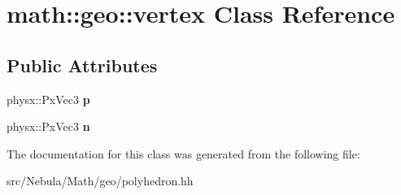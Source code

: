 \hypertarget{classmath_1_1geo_1_1vertex}{\section{math\-:\-:geo\-:\-:vertex \-Class \-Reference}
\label{classmath_1_1geo_1_1vertex}
}
\subsection*{\-Public \-Attributes}
\begin{DoxyCompactItemize}
\item 
\hypertarget{classmath_1_1geo_1_1vertex_ac68d02726094408a170228135a68a1ef}{physx\-::\-Px\-Vec3 {\bfseries p}}\label{classmath_1_1geo_1_1vertex_ac68d02726094408a170228135a68a1ef}

\item 
\hypertarget{classmath_1_1geo_1_1vertex_af0bd124b0e264a44aa5ee617e423c95d}{physx\-::\-Px\-Vec3 {\bfseries n}}\label{classmath_1_1geo_1_1vertex_af0bd124b0e264a44aa5ee617e423c95d}

\end{DoxyCompactItemize}


\-The documentation for this class was generated from the following file\-:\begin{DoxyCompactItemize}
\item 
src/\-Nebula/\-Math/geo/polyhedron.\-hh\end{DoxyCompactItemize}
